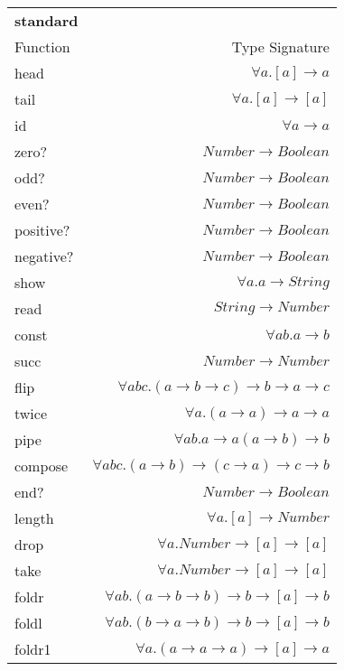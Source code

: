 \begin{table}[H]
    \begin{tabular}{l r}
    \rowcolor{light-gray}
    \textbf{standard} & \\
    Function & Type Signature \\
    \hline
    head & $\forall a. [a] \rightarrow a$ \\
    tail & $\forall a. [a] \rightarrow [a]$ \\
    id & $\forall a \rightarrow a$ \\
    zero? &  $Number \rightarrow Boolean$ \\
    odd? & $Number \rightarrow Boolean$ \\
    even? & $Number \rightarrow Boolean$ \\
    positive? & $Number \rightarrow Boolean$ \\
    negative? & $Number \rightarrow Boolean$ \\
    show & $\forall a. a \rightarrow String$ \\
    read  & $String \rightarrow Number$ \\
    const & $\forall a b. a \rightarrow b$ \\
    succ & $Number \rightarrow Number$ \\
    flip & $\forall a b c. (a \rightarrow b \rightarrow c) \rightarrow b \rightarrow a \rightarrow c$ \\
    twice & $\forall a. (a \rightarrow a) \rightarrow a \rightarrow a$ \\
    pipe & $\forall a b. a \rightarrow a (a \rightarrow b) \rightarrow b$ \\
    compose & $\forall a b c. (a \rightarrow b) \rightarrow (c \rightarrow a) \rightarrow c \rightarrow b$\\
    end? & $Number \rightarrow Boolean$ \\
    length & $\forall a. [a] \rightarrow Number$ \\
    drop & $\forall a. Number \rightarrow [a] \rightarrow [a]$ \\
    take & $\forall a. Number \rightarrow [a] \rightarrow [a]$ \\
    foldr & $\forall a b. (a \rightarrow b \rightarrow b) \rightarrow b \rightarrow [a] \rightarrow b$\\
    foldl & $\forall a b. (b \rightarrow a \rightarrow b) \rightarrow b \rightarrow [a] \rightarrow b$\\
    foldr1 & $\forall a. (a \rightarrow a \rightarrow a) \rightarrow [a] \rightarrow a$\\

\end{tabular}
\end{table}
